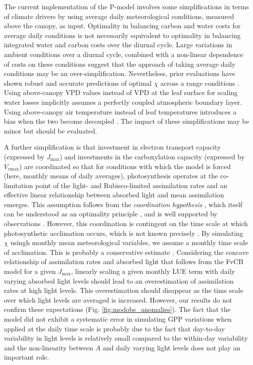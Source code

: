 \documentclass[gmd, manuscript]{copernicus}
\newcommand{\vcmax}{$V_{\text{cmax}}$}
\newcommand{\jmax}{$J_{\text{max}}$}
\begin{document}
The current implementation of the P-model involves some simplifications in terms of climate drivers by using average daily meteorological conditions, measured above the canopy, as input. Optimality in balancing carbon and water costs for average daily conditions is not necessarily equivalent to optimality in balancing integrated water and carbon costs over the diurnal cycle. Large variations in ambient conditions over a diurnal cycle, combined with a non-linear dependence of costs on these conditions suggest that the approach of taking average daily conditions may be an over-simplification. Nevertheless, prior evaluations have shown robust and accurate predictions of optimal $\chi$ across a range conditions \citep{wang17natpl}. Using above-canopy VPD values instead of VPD at the leaf surface for scaling water losses implicitly assumes a perfectly coupled atmospheric boundary layer. Using above-canopy air temperature instead of leaf temperatures introduces a bias when the two become decoupled \citep{michaletz15tee}. The impact of these simplifications may be minor but should be evaluated. %

A further simplification is that investment in electron transport capacity (expressed by \jmax ) and investments in the carboxylation capacity (expressed by \vcmax ) are coordinated so that for conditions with which the model is forced (here, monthly means of daily averages), photosynthesis operates at the co-limitation point of the light- and Rubisco-limited assimilation rates and an effective linear relationship between absorbed light and mean assimilation emerges. This assumption follows from the \textit{coordination hypothesis} \citep{chen93, haxeltine96}, which itself can be understood as an optimality principle \citep{haxeltine96}, and is well supported by observations \citep{maire12po}. However, this coordination is contingent on the time scale at which photosynthetic acclimation occurs, which is not known precisely  \citep{smithdukes13gcb, way14}. By simulating $\chi$ usingh monthly mean meteorological variables, we assume a monthly time scale of acclimation. This is probably a conservative estimate \citep{smithdukes17, veres84}. Considering the concave relationship of assimilation rates and absorbed light that follows from the FvCB model for a given \jmax , linearly scaling a given monthly LUE term with daily varying absorbed light levels should lead to an overestimation of assimilation rates at high light levels. This overestimation should disappear as the time scale over which light levels are averaged is increased. However, our results do not confirm these expectations (Fig. \ref{fig:modobs_anomalies}). The fact that the model did not exhibit a systematic error in simulating GPP variations when applied at the daily time scale is probably due to the fact that day-to-day variability in light levels is relatively small compared to the within-day variability and the non-linearity between $A$ and daily varying light levels does not play an important role.
\end{document}
